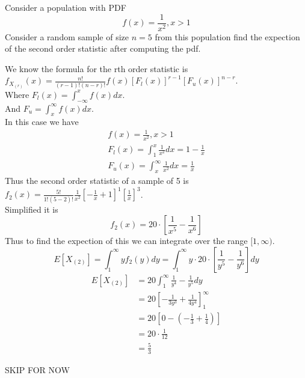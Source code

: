 \documentclass[answers,12pt,addpoints]{exam}
\begin{document}
\begin{questions}
    \question Consider a population with PDF 
    $$f(x) = \frac{1}{x^2}, x > 1 $$
    Consider a random sample of size $n = 5$ from this population find the expection of the second order statistic after computing the pdf.
    \begin{solution}
        We know the formula for the rth order statistic is\\
        $f_{X_{(r)}}(x) = \frac{n!}{(r-1)!(n-r)!}f(x)[F_l(x)]^{r-1}[F_u(x)]^{n-r}$.\\
        Where $F_l(x) = \int_{-\infty}^{x}f(x)dx$.\\
        And $F_u = \int_{x}^{\infty}f(x)dx$.\\
        In this case we have 
        \begin{align*}
            f(x) = \frac{1}{x^2}, x > 1\\
            F_l(x) = \int_{1}^{x}\frac{1}{x^2}dx = 1- \frac{1}{x} \\
            F_u(x) = \int_{x}^{\infty}\frac{1}{x^2}dx = \frac{1}{x}
        \end{align*}
        Thus the second order statistic of a sample of 5 is
        $f_2(x) = \frac{5!}{1!(5-2)!}\frac{1}{x^2}[-\frac{1}{x} + 1]^{1}[\frac{1}{x}]^{3}$.\\
        Simplified it is 
        $$ f_2(x) = 20 \cdot \left[ \frac{1}{x^5} - \frac{1}{x^6} \right]$$
        Thus to find the expection of this we can integrate over the range $[1,\infty)$.
        $$E[X_{(2)}] = \int_{1}^{\infty}y f_2(y)dy = \int_{1}^{\infty}y \cdot 20 \cdot \left[ \frac{1}{y^5} - \frac{1}{y^6} \right]dy$$
        \begin{align*}
            E[X_{(2)}] &= 20 \int_{1}^{\infty} \frac{1}{y^4} - \frac{1}{y^5}dy\\
            &= 20 \left[ -\frac{1}{3y^3} + \frac{1}{4y^4} \right]_{1}^{\infty}\\
            &= 20 \left[ 0 - (-\frac{1}{3} + \frac{1}{4}) \right]\\
            &= 20 \cdot \frac{1}{12}\\
            &= \frac{5}{3}
        \end{align*}
    \end{solution}
    \question SKIP FOR NOW\\


\end{questions}
\end{document}
